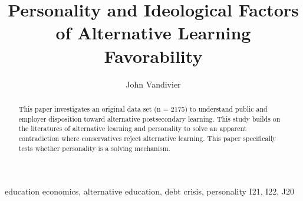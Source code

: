 \documentclass[review]{elsarticle}
\begin{document}
\begin{frontmatter}

    \title{
        Personality and Ideological Factors of Alternative Learning Favorability
    }

    \author[mymainaddress]{John Vandivier} %
    \address[mymainaddress]{4400 University Dr, Fairfax, VA 22030}

    \begin{abstract}
        This paper investigates an original data set (n = 2175) to understand public
        and employer disposition toward alternative postsecondary learning.
        This study builds on the literatures of alternative learning and personality
        to solve an apparent contradiction where conservatives reject alternative learning.
        This paper specifically tests whether personality is a solving mechanism.
    \end{abstract}

    \begin{keyword}
        education economics, alternative education, debt crisis, personality
        \MSC[2010] I21, I22, J20 %
    \end{keyword}

\end{frontmatter}
\end{document}
